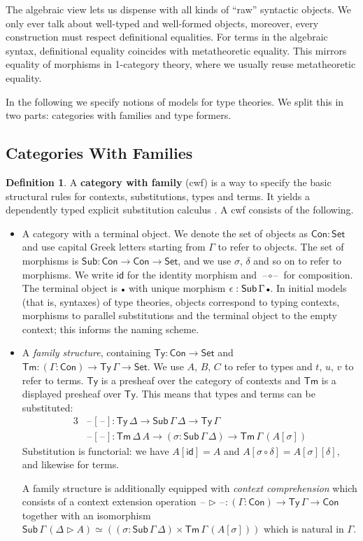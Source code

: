 \documentclass[12pt,a4paper,twoside,openany]{book}
\theoremstyle{remark}
\theoremstyle{definition}
\newtheorem{mydefinition}{Definition}
\theoremstyle{theorem}
\newcommand{\id}{\mathsf{id}}
\newcommand{\Con}{\mathsf{Con}}
\newcommand{\Sub}{\mathsf{Sub}}
\newcommand{\Tm}{\mathsf{Tm}}
\newcommand{\Ty}{\mathsf{Ty}}
\newcommand{\blank}{\mathord{\hspace{1pt}\text{--}\hspace{1pt}}}
\newcommand{\Set}{\mathsf{Set}}
\newcommand{\ext}{\triangleright}
\newcommand{\emptycon}{\scaleobj{.75}\bullet}
\begin{document}
The algebraic view lets us dispense with all kinds of ``raw'' syntactic objects.
We only ever talk about well-typed and well-formed objects, moreover, every
construction must respect definitional equalities. For terms in the algebraic
syntax, definitional equality coincides with metatheoretic equality. This
mirrors equality of morphisms in 1-category theory, where we usually reuse
metatheoretic equality.

In the following we specify notions of models for type theories. We split this
in two parts: categories with families and type formers.

\subsection{Categories With Families}

\begin{mydefinition}
A \textbf{category with family} (cwf) \cite{Dybjer96internaltype} is a way to
specify the basic structural rules for contexts, substitutions, types and
terms. It yields a dependently typed explicit substitution calculus \cite{TODO}.
A cwf consists of the following.
\begin{itemize}
\item
  A category with a terminal object. We denote the set of objects as $\Con :
  \Set$ and use capital Greek letters starting from $\Gamma$ to refer to
  objects. The set of morphisms is $\Sub : \Con \to \Con \to \Set$, and we use
  $\sigma$, $\delta$ and so on to refer to morphisms. We write $\id$ for the
  identity morphism and $\blank\circ\blank$ for composition. The terminal
  object is $\emptycon$ with unique morphism $\epsilon :
  \Sub\,\Gamma\,\emptycon$. In initial models (that is, syntaxes) of type
  theories, objects correspond to typing contexts, morphisms to parallel
  substitutions and the terminal object to the empty context; this informs the
  naming scheme.
\item A \emph{family structure}, containing $\Ty : \Con \to \Set$ and $\Tm :
  (\Gamma : \Con) \to \Ty\,\Gamma \to \Set$. We use $A$, $B$, $C$ to refer to
  types and $t$, $u$, $v$ to refer to terms. $\Ty$ is a presheaf over the
  category of contexts and $\Tm$ is a displayed presheaf over $\Ty$. This means
  that types and terms can be substituted:
  \begin{alignat*}{3}
    &\blank[\blank] : \Ty\,\Delta \to \Sub\,\Gamma\,\Delta \to \Ty\,\Gamma\\
    &\blank[\blank] : \Tm\,\Delta\,A \to (\sigma : \Sub\,\Gamma\,\Delta) \to \Tm\,\Gamma\,(A[\sigma])
  \end{alignat*}
  Substitution is functorial: we have $A[\id] = A$ and
  $A[\sigma\circ\delta] = A[\sigma][\delta]$, and likewise for terms.

  A family structure is additionally equipped with \emph{context comprehension}
  which consists of a context extension operation $\blank\ext\blank : (\Gamma :
  \Con) \to \Ty\,\Gamma \to \Con$ together with an isomorphism
  $\Sub\,\Gamma\,(\Delta\ext A) \simeq ((\sigma : \Sub\,\Gamma\,\Delta) \times
  \Tm\,\Gamma\,(A[\sigma]))$ which is natural in $\Gamma$.
\end{itemize}
\end{mydefinition}
\end{document}
